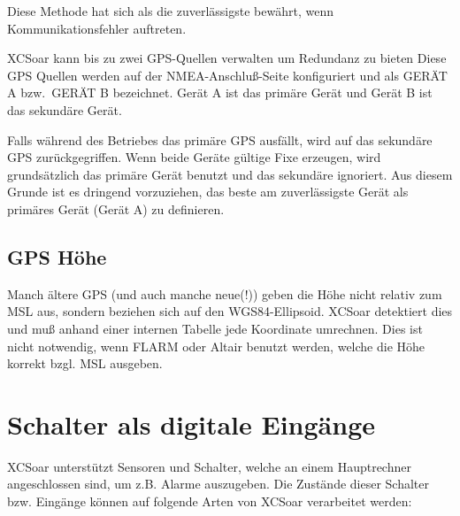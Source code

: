 Diese Methode hat sich als die zuverlässigste bewährt, wenn Kommunikationsfehler auftreten.

\textsf{XCSoar} kann bis zu zwei GPS-Quellen verwalten um Redundanz zu bieten
Diese GPS Quellen werden auf der NMEA-Anschluß-Seite konfiguriert und als GERÄT A bzw.\ GERÄT B 
bezeichnet.  Gerät  A ist das primäre Gerät und Gerät B ist das sekundäre Gerät.


Falls während des Betriebes das primäre GPS ausfällt, wird auf das sekundäre GPS zurückgegriffen. Wenn beide Geräte gültige Fixe erzeugen, wird grundsätzlich das primäre Gerät benutzt und das sekundäre ignoriert.  Aus diesem Grunde ist es dringend vorzuziehen, das beste am zuverlässigste Gerät als primäres Gerät (Gerät A) zu definieren.

\subsection*{GPS Höhe}

Manch ältere GPS  (und auch manche neue(!)) geben die Höhe nicht relativ zum MSL aus, sondern beziehen sich auf den WGS84-Ellipsoid.  \textsf{XCSoar} detektiert dies und muß anhand einer internen Tabelle jede Koordinate umrechnen.
Dies ist nicht notwendig, wenn FLARM oder \textsf{Altair} benutzt werden, welche die Höhe korrekt bzgl. MSL ausgeben.
\section{Schalter als digitale Eingänge}

\textsf{XCSoar} unterstützt Sensoren und Schalter, welche an einem Hauptrechner angeschlossen sind, um z.B. Alarme auszugeben. Die Zustände dieser Schalter bzw. Eingänge können auf folgende Arten von \textsf{XCSoar} verarbeitet werden:

